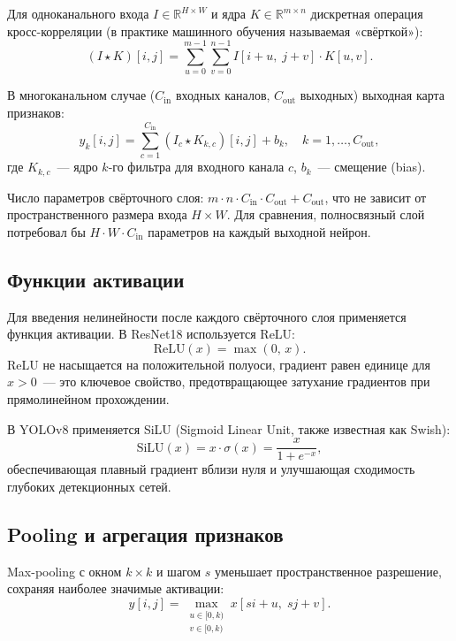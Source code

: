 \documentclass[14pt,a4paper]{report}
\numberwithin{equation}{chapter}
\numberwithin{figure}{chapter}
\numberwithin{table}{chapter}
\begin{document}
Для одноканального входа $I \in \mathbb{R}^{H \times W}$ и ядра
$K \in \mathbb{R}^{m \times n}$ дискретная операция кросс-корреляции
(в практике машинного обучения называемая «свёрткой»):
\begin{equation}
  (I \star K)[i,j] = \sum_{u=0}^{m-1}\sum_{v=0}^{n-1}
    I[i+u,\; j+v]\cdot K[u,v].
\end{equation}

В многоканальном случае ($C_{\mathrm{in}}$ входных каналов,
$C_{\mathrm{out}}$ выходных) выходная карта признаков:
\begin{equation}
  y_k[i,j] = \sum_{c=1}^{C_{\mathrm{in}}}
    (I_c \star K_{k,c})[i,j] + b_k,
  \quad k = 1,\ldots,C_{\mathrm{out}},
\end{equation}
где $K_{k,c}$~--- ядро $k$-го фильтра для входного канала $c$,
$b_k$~--- смещение (bias).

Число параметров свёрточного слоя: $m \cdot n \cdot C_{\mathrm{in}}
\cdot C_{\mathrm{out}} + C_{\mathrm{out}}$, что не зависит от
пространственного размера входа $H \times W$. Для сравнения,
полносвязный слой потребовал бы $H \cdot W \cdot C_{\mathrm{in}}$
параметров на каждый выходной нейрон.

\subsection{Функции активации}

Для введения нелинейности после каждого свёрточного слоя
применяется функция активации. В ResNet18 используется ReLU:
\begin{equation}
  \mathrm{ReLU}(x) = \max(0,\, x).
\end{equation}
ReLU не насыщается на положительной полуоси, градиент равен
единице для $x > 0$~--- это ключевое свойство, предотвращающее
затухание градиентов при прямолинейном прохождении.

В YOLOv8 применяется SiLU (Sigmoid Linear Unit,
также известная как Swish):
\begin{equation}
  \mathrm{SiLU}(x) = x \cdot \sigma(x) = \frac{x}{1 + e^{-x}},
\end{equation}
обеспечивающая плавный градиент вблизи нуля и улучшающая
сходимость глубоких детекционных сетей.

\subsection{Pooling и агрегация признаков}

Max-pooling с окном $k\times k$ и шагом $s$ уменьшает
пространственное разрешение, сохраняя наиболее значимые активации:
\begin{equation}
  y[i,j] = \max_{\substack{u\in[0,k)\\ v\in[0,k)}}
            x[si+u,\; sj+v].
\end{equation}
\end{document}
